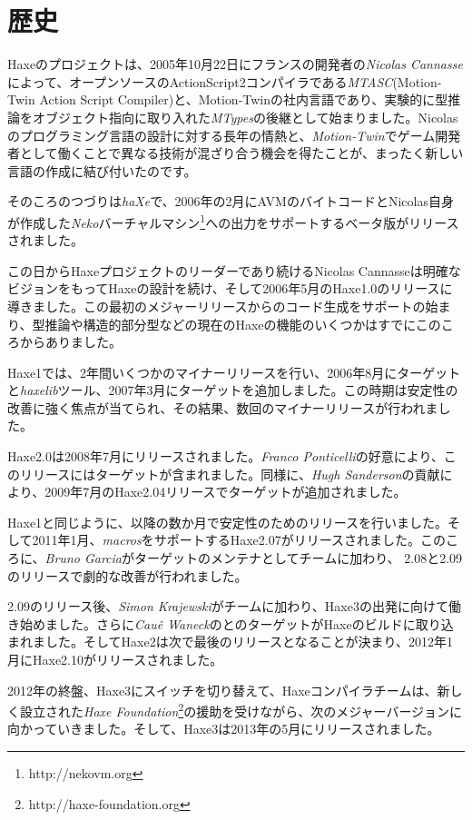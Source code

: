 \section{歴史}
\label{introduction-haxe-history}

Haxeのプロジェクトは、2005年10月22日にフランスの開発者の\emph{Nicolas Cannasse}によって、オープンソースのActionScript2コンパイラである\emph{MTASC}(Motion-Twin Action Script Compiler)と、Motion-Twinの社内言語であり、実験的に型推論をオブジェクト指向に取り入れた\emph{MTypes}の後継として始まりました。Nicolasのプログラミング言語の設計に対する長年の情熱と、\emph{Motion-Twin}でゲーム開発者として働くことで異なる技術が混ざり合う機会を得たことが、まったく新しい言語の作成に結び付いたのです。

そのころのつづりは\emph{haXe}で、2006年の2月にAVMのバイトコードとNicolas自身が作成した\emph{Neko}バーチャルマシン\footnote{http://nekovm.org}への出力をサポートするベータ版がリリースされました。

この日からHaxeプロジェクトのリーダーであり続けるNicolas Cannasseは明確なビジョンをもってHaxeの設計を続け、そして2006年5月のHaxe1.0のリリースに導きました。この最初のメジャーリリースからのコード生成をサポートの始まり、型推論や構造的部分型などの現在のHaxeの機能のいくつかはすでにこのころからありました。

Haxe1では、2年間いくつかのマイナーリリースを行い、2006年8月にターゲットと\emph{haxelib}ツール、2007年3月にターゲットを追加しました。この時期は安定性の改善に強く焦点が当てられ、その結果、数回のマイナーリリースが行われました。

Haxe2.0は2008年7月にリリースされました。\emph{Franco Ponticelli}の好意により、このリリースにはターゲットが含まれました。同様に、\emph{Hugh Sanderson}の貢献により、2009年7月のHaxe2.04リリースでターゲットが追加されました。

Haxe1と同じように、以降の数か月で安定性のためのリリースを行いました。そして2011年1月、\emph{macros}をサポートするHaxe2.07がリリースされました。このころに、\emph{Bruno Garcia}がターゲットのメンテナとしてチームに加わり、 2.08と2.09のリリースで劇的な改善が行われました。

2.09のリリース後、\emph{Simon Krajewski}がチームに加わり、Haxe3の出発に向けて働き始めました。さらに\emph{Cau\^{e} Waneck}のとのターゲットがHaxeのビルドに取り込まれました。そしてHaxe2は次で最後のリリースとなることが決まり、2012年1月にHaxe2.10がリリースされました。

2012年の終盤、Haxe3にスイッチを切り替えて、Haxeコンパイラチームは、新しく設立された\emph{Haxe Foundation}\footnote{http://haxe-foundation.org}の援助を受けながら、次のメジャーバージョンに向かっていきました。そして、Haxe3は2013年の5月にリリースされました。
